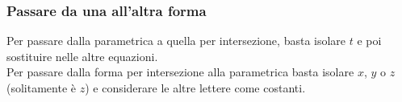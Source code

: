 \subsubsection{Passare da una all'altra forma}
Per passare dalla parametrica a quella per intersezione, basta isolare $t$ e poi sostituire nelle
altre equazioni.\\
Per passare dalla forma per intersezione alla parametrica basta isolare $x$, $y$ o $z$ 
(solitamente è $z$) e considerare le altre lettere come costanti.
